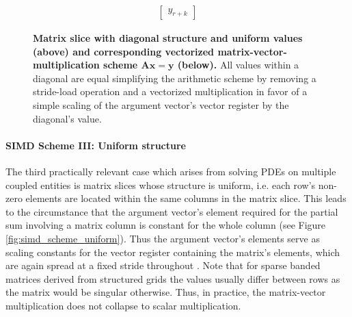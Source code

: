 \documentclass{article}
\begin{document}
\begin{figure}[ht]
$$\begin{matrix}
\begin{bmatrix}
                                                                                                                 y_{r+k}
                                                                                                                \end{bmatrix}
        \end{matrix}
        $$
        \caption[Matrix slice with diagonal structure and uniform values and corresponding vectorized matrix-vector-multiplication scheme.]{\textbf{Matrix slice with diagonal structure and uniform values (above) and corresponding vectorized matrix-vector-multiplication scheme $\bm{Ax = y}$ (below).} All values within a diagonal are equal simplifying the arithmetic scheme by removing a stride-load operation and a vectorized multiplication in favor of a simple scaling of the argument vector's vector register by the diagonal's value.}
        \label{fig:simd_scheme_diag_collated}
      \end{figure}

      \paragraph{SIMD Scheme III: Uniform structure}

      The third practically relevant case which arises from solving PDEs on multiple coupled entities is matrix slices whose structure is uniform, i.e. each row's non-zero elements are located within the same columns in the matrix slice. This leads to the circumstance that the argument vector's element required for the partial sum involving a matrix column is constant for the whole column (see Figure \ref{fig:simd_scheme_uniform}). Thus the argument vector's elements serve as scaling constants for the vector register containing the matrix's elements, which are again spread at a fixed stride throughout \V. Note that for sparse banded matrices derived from structured grids the values usually differ between rows as the matrix would be singular otherwise. Thus, in practice, the matrix-vector multiplication does not collapse to scalar multiplication.
\end{document}
